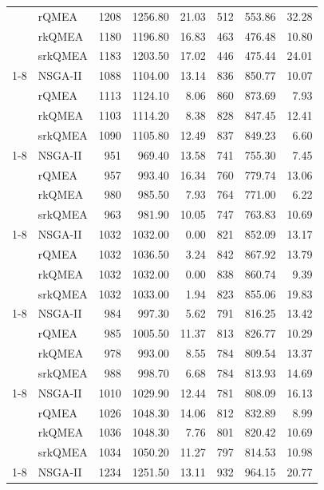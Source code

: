 \begin{tabular}{llrrrrrr}
 & rQMEA & 1208 & 1256.80 & 21.03 & 512 & 553.86 & 32.28 \\
 & rkQMEA & 1180 & 1196.80 & 16.83 & 463 & 476.48 & 10.80 \\
 & srkQMEA & 1183 & 1203.50 & 17.02 & 446 & 475.44 & 24.01 \\
\cline{1-8}
\multirow[t]{4}{*}{la21} & NSGA-II & 1088 & 1104.00 & 13.14 & 836 & 850.77 & 10.07 \\
 & rQMEA & 1113 & 1124.10 & 8.06 & 860 & 873.69 & 7.93 \\
 & rkQMEA & 1103 & 1114.20 & 8.38 & 828 & 847.45 & 12.41 \\
 & srkQMEA & 1090 & 1105.80 & 12.49 & 837 & 849.23 & 6.60 \\
\cline{1-8}
\multirow[t]{4}{*}{la22} & NSGA-II & 951 & 969.40 & 13.58 & 741 & 755.30 & 7.45 \\
 & rQMEA & 957 & 993.40 & 16.34 & 760 & 779.74 & 13.06 \\
 & rkQMEA & 980 & 985.50 & 7.93 & 764 & 771.00 & 6.22 \\
 & srkQMEA & 963 & 981.90 & 10.05 & 747 & 763.83 & 10.69 \\
\cline{1-8}
\multirow[t]{4}{*}{la23} & NSGA-II & 1032 & 1032.00 & 0.00 & 821 & 852.09 & 13.17 \\
 & rQMEA & 1032 & 1036.50 & 3.24 & 842 & 867.92 & 13.79 \\
 & rkQMEA & 1032 & 1032.00 & 0.00 & 838 & 860.74 & 9.39 \\
 & srkQMEA & 1032 & 1033.00 & 1.94 & 823 & 855.06 & 19.83 \\
\cline{1-8}
\multirow[t]{4}{*}{la24} & NSGA-II & 984 & 997.30 & 5.62 & 791 & 816.25 & 13.42 \\
 & rQMEA & 985 & 1005.50 & 11.37 & 813 & 826.77 & 10.29 \\
 & rkQMEA & 978 & 993.00 & 8.55 & 784 & 809.54 & 13.37 \\
 & srkQMEA & 988 & 998.70 & 6.68 & 784 & 813.93 & 14.69 \\
\cline{1-8}
\multirow[t]{4}{*}{la25} & NSGA-II & 1010 & 1029.90 & 12.44 & 781 & 808.09 & 16.13 \\
 & rQMEA & 1026 & 1048.30 & 14.06 & 812 & 832.89 & 8.99 \\
 & rkQMEA & 1036 & 1048.30 & 7.76 & 801 & 820.42 & 10.69 \\
 & srkQMEA & 1034 & 1050.20 & 11.27 & 797 & 814.53 & 10.98 \\
\cline{1-8}
\multirow[t]{4}{*}{la26} & NSGA-II & 1234 & 1251.50 & 13.11 & 932 & 964.15 & 20.77 \\

\end{tabular}
